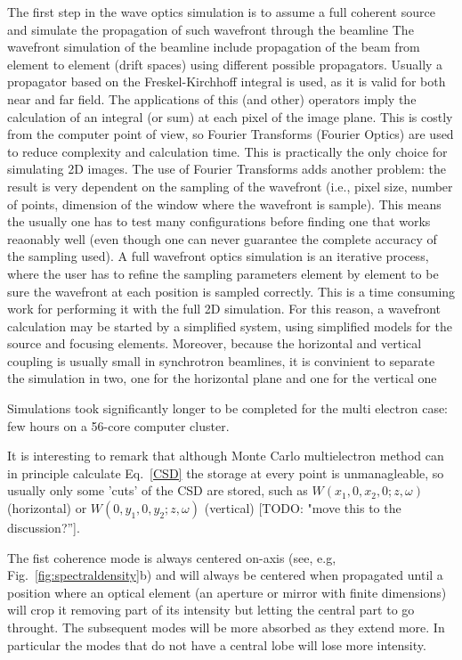 \documentclass{iucr}              %
\newcommand{\todo}[1]{{\color{red}[TODO: "#1'']}}
\begin{document}
The first step in the wave optics simulation is to assume a full coherent source and simulate the propagation of such wavefront through the beamline
The wavefront simulation of the beamline include propagation of the beam from element to element (drift spaces) using different possible propagators. Usually a propagator based on the Freskel-Kirchhoff integral is used, as it is valid for both near and far field. The applications of this (and other) operators imply the calculation of an integral (or sum) at each pixel of the image plane. This is costly from the computer point of view, so Fourier Transforms (Fourier Optics) are used to reduce complexity and calculation time. This is practically the only choice for simulating 2D images. The use of Fourier Transforms adds another problem: the result is very dependent on the sampling of the wavefront (i.e., pixel size, number of points, dimension of the window where the wavefront is sample). This means the usually one has to test many configurations before finding one that works reaonably well (even though one can never guarantee the complete accuracy of the sampling used). A full wavefront optics simulation is an iterative process, where the user has to refine the sampling parameters element by element to be sure the wavefront at each position is sampled correctly. This is a time consuming work for performing it with the full 2D simulation. For this reason, a wavefront calculation may be started by a simplified system, using simplified models for the source and focusing elements. Moreover, because the horizontal and vertical coupling is usually small in synchrotron beamlines, it is convinient to separate the simulation in two, one for the horizontal plane and one for the vertical one


Simulations took significantly longer to be completed for the multi electron case: few hours on a 56-core computer cluster.




It is interesting to remark that although Monte Carlo multielectron method can in principle calculate Eq.~\ref{CSD} the storage at every point is unmanagleable, so usually only some 'cuts' of the CSD are stored, such as $W(x_1,0,x_2,0;z,\omega)$ (horizontal) or $W(0,y_1,0,y_2;z,\omega)$ (vertical) \todo{move this to the discussion?}.


The fist coherence mode is always centered on-axis (see, e.g, Fig.~\ref{fig:spectraldensity}b) and will always be centered when propagated until a position where an optical element (an aperture or mirror with finite dimensions) will crop it removing part of its intensity but letting the central part to go throught. The subsequent modes will be more absorbed as they extend more. In particular the modes that do not have a central lobe will lose more intensity. 
\end{document}
